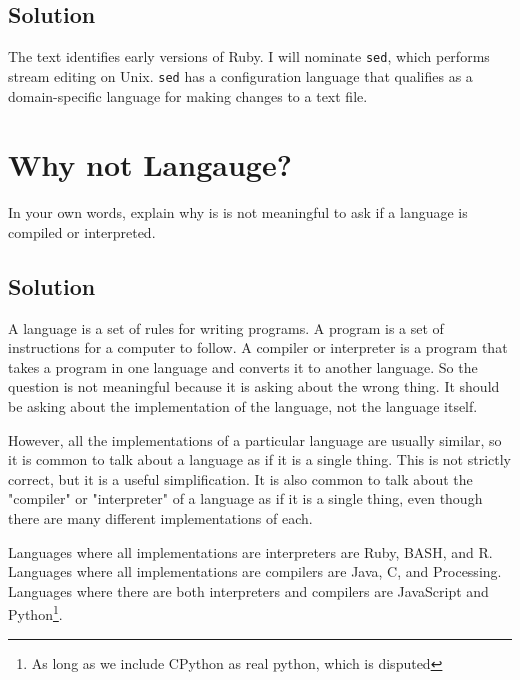 \documentclass[twoside=false, DIV=14]{scrartcl}
\begin{document}
  \subsection*{Solution}
  The text identifies early versions of Ruby. I will nominate \texttt{sed}, which performs stream editing on Unix. \texttt{sed} has a configuration language that qualifies as a domain-specific language for making changes to a text file.

\section*{Why not Langauge?}
In your own words, explain why is is not meaningful to ask if a language is compiled or interpreted.

\subsection*{Solution}
A language is a set of rules for writing programs.  A program is a set of instructions for a computer to follow.  A compiler or interpreter is a program that takes a program in one language and converts it to another language.  So the question is not meaningful because it is asking about the wrong thing.  It should be asking about the implementation of the language, not the language itself.  

However, all the implementations of a particular language are usually similar, so it is common to talk about a language as if it is a single thing.  This is not strictly correct, but it is a useful simplification.  It is also common to talk about the "compiler" or "interpreter" of a language as if it is a single thing, even though there are many different implementations of each.

Languages where all implementations are interpreters are Ruby, BASH, and R.  Languages where all implementations are compilers are Java, C, and Processing.  Languages where there are both interpreters and compilers are JavaScript and Python\footnote{As long as we include CPython as real python, which is disputed}.
\end{document}
